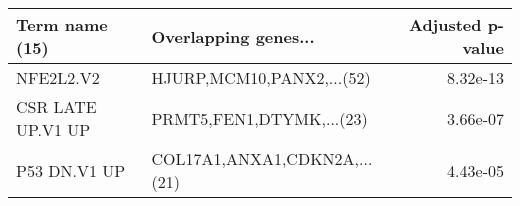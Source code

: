 \begin{tabular}{llr}
\toprule
   Term name (15) &         Overlapping genes... &  Adjusted p-value \\
\midrule
        NFE2L2.V2 &    HJURP,MCM10,PANX2,...(52) &          8.32e-13 \\
CSR LATE UP.V1 UP &     PRMT5,FEN1,DTYMK,...(23) &          3.66e-07 \\
     P53 DN.V1 UP & COL17A1,ANXA1,CDKN2A,...(21) &          4.43e-05 \\
\bottomrule
\end{tabular}
